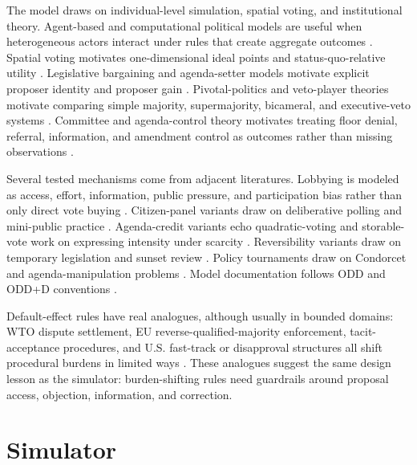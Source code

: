 \documentclass[manuscript,review,anonymous]{acmart}
\begin{document}
The model draws on individual-level simulation, spatial voting, and institutional theory. Agent-based and computational political models are useful when heterogeneous actors interact under rules that create aggregate outcomes \citep{Epstein2006,GilbertTroitzsch2005,deMarchiPage2014}. Spatial voting motivates one-dimensional ideal points and status-quo-relative utility \citep{Downs1957}. Legislative bargaining and agenda-setter models motivate explicit proposer identity and proposer gain \citep{BaronFerejohn1989,RomerRosenthal1978}. Pivotal-politics and veto-player theories motivate comparing simple majority, supermajority, bicameral, and executive-veto systems \citep{Krehbiel1998,Tsebelis2002}. Committee and agenda-control theory motivates treating floor denial, referral, information, and amendment control as outcomes rather than missing observations \citep{CoxMcCubbins2005,GilliganKrehbiel1987,Krehbiel1991,Shepsle1979,ShepsleWeingast1987,WeingastMarshall1988}.

Several tested mechanisms come from adjacent literatures. Lobbying is modeled as access, effort, information, public pressure, and participation bias rather than only direct vote buying \citep{AustenSmith1993,AustenSmith1995,HallDeardorff2006,HallWayman1990,deFigueiredoRichter2014,GilensPage2014}. Citizen-panel variants draw on deliberative polling and mini-public practice \citep{Fishkin2009,OECD2020}. Agenda-credit variants echo quadratic-voting and storable-vote work on expressing intensity under scarcity \citep{Casella2005,LalleyWeyl2018}. Reversibility variants draw on temporary legislation and sunset review \citep{Gersen2007,Ranchordas2014}. Policy tournaments draw on Condorcet and agenda-manipulation problems \citep{McKelvey1976,Tideman1987}. Model documentation follows ODD and ODD+D conventions \citep{Grimm2010,Muller2013}.

Default-effect rules have real analogues, although usually in bounded domains: WTO dispute settlement, EU reverse-qualified-majority enforcement, tacit-acceptance procedures, and U.S. fast-track or disapproval structures all shift procedural burdens in limited ways \citep{WTO1994,EuropeanParliament2011,ChurchillUlfstein2000,CRA1996,CRSFastTrack2024}. These analogues suggest the same design lesson as the simulator: burden-shifting rules need guardrails around proposal access, objection, information, and correction.

\section{Simulator}
\end{document}
